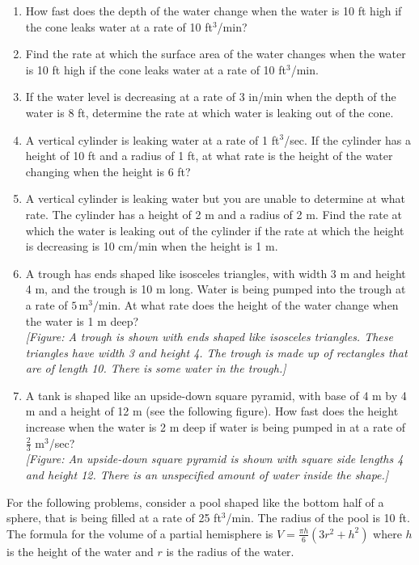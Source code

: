 \documentclass{exercises}
\begin{document}
\begin{enumerate}[resume]
\item How fast does the depth of the water change when the water is 10 ft high if the cone leaks water at a rate of 10 ft$^{3}$/min?
\item Find the rate at which the surface area of the water changes when the water is 10 ft high if the cone leaks water at a rate of 10 ft$^{3}$/min.
\item If the water level is decreasing at a rate of 3 in/min when the depth of the water is 8 ft, determine the rate at which water is leaking out of the cone.
\item A vertical cylinder is leaking water at a rate of 1 ft$^{3}$/sec. If the cylinder has a height of 10 ft and a radius of 1 ft, at what rate is the height of the water changing when the height is 6 ft?
\item A vertical cylinder is leaking water but you are unable to determine at what rate. The cylinder has a height of 2 m and a radius of 2 m. Find the rate at which the water is leaking out of the cylinder if the rate at which the height is decreasing is 10 cm/min when the height is 1 m.
\item A trough has ends shaped like isosceles triangles, with width 3 m and height 4 m, and the trough is 10 m long. Water is being pumped into the trough at a rate of $5\,\text{m}^{3}\text{/min}$. At what rate does the height of the water change when the water is 1 m deep? \\ \textit{[Figure: A trough is shown with ends shaped like isosceles triangles. These triangles have width 3 and height 4. The trough is made up of rectangles that are of length 10. There is some water in the trough.]}
\item A tank is shaped like an upside-down square pyramid, with base of 4 m by 4 m and a height of 12 m (see the following figure). How fast does the height increase when the water is 2 m deep if water is being pumped in at a rate of $\frac{2}{3}$ m$^{3}$/sec? \\ \textit{[Figure: An upside-down square pyramid is shown with square side lengths 4 and height 12. There is an unspecified amount of water inside the shape.]}
\end{enumerate}

For the following problems, consider a pool shaped like the bottom half of a sphere, that is being filled at a rate of 25 ft$^{3}$/min. The radius of the pool is 10 ft. The formula for the volume of a partial hemisphere is $V=\frac{\pi h}{6}(3r^{2}+h^{2})$ where $h$ is the height of the water and $r$ is the radius of the water.
\end{document}
